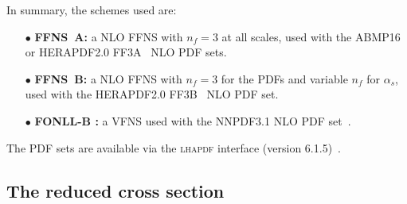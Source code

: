 \documentclass[pdftex,twocolumn,epjc3]{svjour3}          %
\newcommand{\abmp} {ABMP16\xspace}
\newcommand{\nnpdf} {NNPDF3.1\xspace}
\newcommand{\lhapdf} {{\textsc{lhapdf}}\xspace}
\newcommand{\ffns} {{FFNS~A}\xspace}
\newcommand{\ffnsb} {{FFNS~B}\xspace}
\newcommand{\ffthreea} {{\hbox{HERAPDF2.0} FF3A}\xspace}
\newcommand{\ffthreeb} {{\hbox{HERAPDF2.0} FF3B}\xspace}
\begin{document}
In summary, the schemes used are:
\begin{itemize}
  \setlength\itemsep{1em}

\item[$\bullet$] {\bf \ffns :} a NLO FFNS with $n_f = 3$ at all
  scales, used with the \abmp~\cite{Alekhin:2018pai} or
  \ffthreea~\cite{Abramowicz:2015mha} NLO PDF sets.

\item[$\bullet$] {\bf \ffnsb :} a NLO FFNS with $n_f = 3$ for the PDFs
  and variable $n_f$ for $\alpha_s$, used with the
  \ffthreeb~\cite{Abramowicz:2015mha} NLO PDF set.

\item[$\bullet$] {\bf FONLL-B :} a VFNS used with the \nnpdf NLO PDF
  set~\cite{Ball:2017nwa}.
\end{itemize}
The PDF sets are available via the \lhapdf interface (version
6.1.5)~\cite{Buckley:2014ana}.

%
\subsection{The reduced cross section}\label{sec-redsigma}
\end{document}
